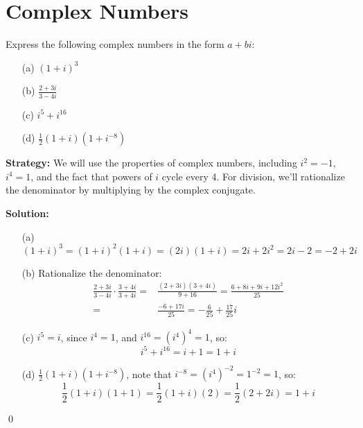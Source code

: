 \section{Complex Numbers}

\begin{problembox}
\begin{problemstatement}
Express the following complex numbers in the form \( a + bi \):

\begin{enumerate}
\item[(a)] \( (1 + i)^3 \)
\item[(b)] \( \frac{2 + 3i}{3 - 4i} \)
\item[(c)] \( i^5 + i^{16} \)
\item[(d)] \( \frac{1}{2}(1 + i)(1 + i^{-8}) \)
\end{enumerate}
\end{problemstatement}
\end{problembox}

\noindent\textbf{Strategy:} We will use the properties of complex numbers, including $i^2 = -1$, $i^4 = 1$, and the fact that powers of $i$ cycle every 4. For division, we'll rationalize the denominator by multiplying by the complex conjugate.

\bigskip\noindent\textbf{Solution:}

\begin{itemize}
\item[(a)] \( (1 + i)^3 = (1 + i)^2 (1 + i) = (2i)(1 + i) = 2i + 2i^2 = 2i - 2 = -2 + 2i \)

\item[(b)] Rationalize the denominator:
\begin{align*}
\frac{2 + 3i}{3 - 4i} \cdot \frac{3 + 4i}{3 + 4i} =& \frac{(2 + 3i)(3 + 4i)}{9 + 16} = \frac{6 + 8i + 9i + 12i^2}{25} \\
=& \frac{-6 + 17i}{25} = -\frac{6}{25} + \frac{17}{25}i
\end{align*}

\item[(c)] \( i^5 = i \), since \( i^4 = 1 \), and \( i^{16} = (i^4)^4 = 1 \), so:
\[
i^5 + i^{16} = i + 1 = 1 + i
\]

\item[(d)] \( \frac{1}{2}(1 + i)(1 + i^{-8}) \), note that \( i^{-8} = (i^4)^{-2} = 1^{-2} = 1 \), so:
\[
\frac{1}{2}(1 + i)(1 + 1) = \frac{1}{2}(1 + i)(2) = \frac{1}{2}(2 + 2i) = 1 + i
\]
\end{itemize}\qed


